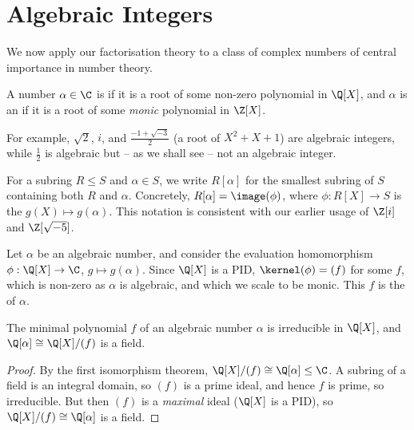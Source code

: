 \section{Algebraic Integers}

We now apply our factorisation theory to a class of complex numbers of central importance in number theory.

\begin{definition}
	A number $\alpha \in \C$ is  if it is a root of some non-zero polynomial in $\Q[X]$, and $\alpha$ is an  if it is a root of some \emph{monic} polynomial in $\Z[X]$.
\end{definition}

For example, $\sqrt{2}$, $i$, and $\frac{-1 + \sqrt{-3}}{2}$ (a root of $X^2 + X + 1$) are algebraic integers, while $\frac{1}{2}$ is algebraic but -- as we shall see -- not an algebraic integer.

For a subring $R \leq S$ and $\alpha \in S$, we write $R[\alpha]$ for the smallest subring of $S$ containing both $R$ and $\alpha$. Concretely, $R[\alpha] = \image(\phi)$, where $\phi: R[X] \rightarrow S$ is the  $g(X) \mapsto g(\alpha)$. This notation is consistent with our earlier usage of $\Z[i]$ and $\Z[\sqrt{-5}]$.

\begin{definition}
	Let $\alpha$ be an algebraic number, and consider the evaluation homomorphism $\phi: \Q[X] \rightarrow \C$, $g \mapsto g(\alpha)$. Since $\Q[X]$ is a PID, $\kernel(\phi) = (f)$ for some $f$, which is non-zero as $\alpha$ is algebraic, and which we scale to be monic. This $f$ is the  of $\alpha$.
\end{definition}

\begin{proposition}
	The minimal polynomial $f$ of an algebraic number $\alpha$ is irreducible in $\Q[X]$, and $\Q[\alpha] \cong \Q[X]/(f)$ is a field.
\end{proposition}
\begin{proof}
	By the first isomorphism theorem, $\Q[X]/(f) \cong \Q[\alpha] \leq \C$. A subring of a field is an integral domain, so $(f)$ is a prime ideal, and hence $f$ is prime, so irreducible. But then $(f)$ is a \emph{maximal} ideal ($\Q[X]$ is a PID), so $\Q[X]/(f) \cong \Q[\alpha]$ is a field.
\end{proof}

